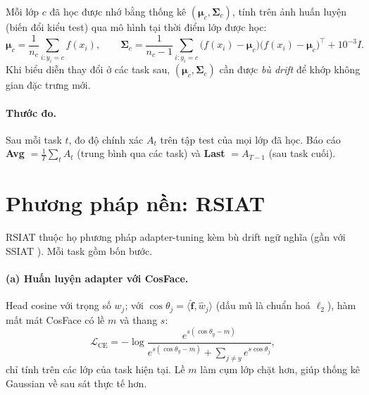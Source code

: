 \documentclass[11pt]{article}
\newcommand{\bmu}{\boldsymbol{\mu}}
\newcommand{\bSigma}{\boldsymbol{\Sigma}}
\newcommand{\vf}{\mathbf{f}}
\begin{document}
Mỗi lớp $c$ đã học được nhớ bằng thống kê $(\bmu_c,\bSigma_c)$, tính trên ảnh huấn luyện (biến đổi kiểu test) qua mô
hình tại thời điểm lớp được học:
\begin{equation}
  \bmu_c=\frac{1}{n_c}\sum_{i:y_i=c} f(x_i),\qquad
  \bSigma_c=\frac{1}{n_c-1}\sum_{i:y_i=c}\big(f(x_i)-\bmu_c\big)\big(f(x_i)-\bmu_c\big)^{\!\top}+10^{-3}I .
\end{equation}
Khi biểu diễn thay đổi ở các task sau, $(\bmu_c,\bSigma_c)$ cần được \emph{bù drift} để khớp không gian đặc trưng mới.

\paragraph{Thước đo.} Sau mỗi task $t$, đo độ chính xác $A_t$ trên tập test của mọi lớp đã học. Báo cáo
\textbf{Avg} $=\frac1T\sum_t A_t$ (trung bình qua các task) và \textbf{Last} $=A_{T-1}$ (sau task cuối).

\section{Phương pháp nền: RSIAT}\label{sec:rsiat}

RSIAT thuộc họ phương pháp adapter-tuning kèm bù drift ngữ nghĩa (gần với SSIAT \cite{ssiat}). Mỗi task gồm bốn bước.

\paragraph{(a) Huấn luyện adapter với CosFace.} Head cosine với trọng số $w_j$; với $\cos\theta_j=\langle
\hat{\vf},\hat w_j\rangle$ (dấu mũ là chuẩn hoá $\ell_2$), hàm mất mát CosFace \cite{cosface} có lề $m$ và thang $s$:
\begin{equation}
  \mathcal{L}_{\text{CE}}=-\log\frac{e^{s(\cos\theta_y-m)}}{e^{s(\cos\theta_y-m)}+\sum_{j\neq y}e^{s\cos\theta_j}},
\end{equation}
chỉ tính trên các lớp của task hiện tại. Lề $m$ làm cụm lớp chặt hơn, giúp thống kê Gaussian về sau sát thực tế hơn.
\end{document}
